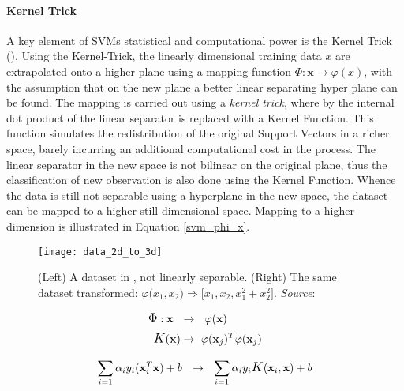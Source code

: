 	\par		
	\paragraph{Kernel Trick}
	A key element of SVMs statistical and computational power is the Kernel Trick (\cite{guyon1993automatic}). Using the Kernel-Trick, the linearly dimensional training data $x$ are extrapolated onto a higher plane using a mapping function $\Phi:\textbf{x} \rightarrow \varphi(x)$, with the assumption that on the new plane a better linear separating hyper plane can be found. The mapping is carried out using a \textit{kernel trick}, where by the internal dot product of the linear separator is replaced with a Kernel Function. This function simulates the redistribution of the original Support Vectors in a richer space, barely incurring an additional computational cost in the process. The linear separator in the new space is not bilinear on the original plane, thus the classification of new observation is also done using the Kernel Function. Whence the data is still not separable using a hyperplane in the new space, the dataset can be mapped to a higher still dimensional space. Mapping to a higher dimension is illustrated in Equation \ref{svm_phi_x}.
	
	\begin{figure}[h]
		\centering
		\captionsetup{width=0.8\textwidth}
		\texttt{[image: data\_2d\_to\_3d]}
		\caption[SVM Dimensionianl Extrapolation]{
			\footnotesize{
				(Left) A dataset in  , not linearly separable. (Right) The same dataset transformed:
				$\varphi \big(x_1, x_2\big) \Rightarrow \big[ x_1,x_2,x_1^2+x_2^2 \big]$.
				\textit{Source}: \cite{kimso}
			}
		}
	\end{figure}

	\begin{equation}
		\begin{aligned}
			\mathlarger{\Phi}: \textbf{x} \ \ &\rightarrow \ \  \varphi(\textbf{x}) \\
			\mathlarger{K}(\textbf{x}) &\rightarrow \ \varphi(\textbf{x}_j)^T \varphi(\textbf{x}_j)
		\end{aligned}
		\label{svm_phi_x}
	\end{equation}
	
	\begin{equation}
		\sum_{i=1} \alpha_i y_i (\textbf{x}_i^T \textbf{x}) + b  \ \  \rightarrow \ \ 
		\sum_{i=1} \alpha_i y_i \mathlarger{K}(\textbf{x}_i, \textbf{x}) + b
		\label{svm_insert_kernel}
	\end{equation}
	
